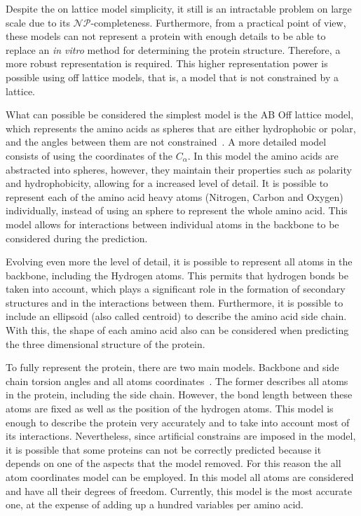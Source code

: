 Despite the on lattice model simplicity, it still is an intractable problem on large scale due to its $\mathcal{NP}$-completeness. Furthermore, from a practical point of view, these models can not represent a protein with enough details to be able to replace an \textit{in vitro} method for determining the protein structure. Therefore, a more robust representation is required. This higher representation power is possible using off lattice models, that is, a model that is not constrained by a lattice.

What can possible be considered the simplest model is the AB Off lattice model, which represents the amino acids as spheres that are either hydrophobic or polar, and the angles between them are not constrained~\cite{berger1998protein}.
A more detailed model consists of using the coordinates of the $C_\alpha$. In this model the amino acids are abstracted into spheres, however, they maintain their properties such as polarity and hydrophobicity, allowing for a increased level of detail. It is possible to represent each of the amino acid heavy atoms (Nitrogen, Carbon and Oxygen) individually, instead of using an sphere to represent the whole amino acid. This model allows for interactions between individual atoms in the  backbone to be considered during the prediction.

Evolving even more the level of detail, it is possible to represent all atoms in the backbone, including the Hydrogen atoms. This permits that hydrogen bonds be taken into account, which plays a significant
role in the formation of secondary structures and in the interactions between them. Furthermore, it is possible to include an ellipsoid (also called centroid) to describe the amino acid side chain. With this, the shape of each amino acid also can be considered when predicting the three dimensional structure of the protein.

To fully represent the protein, there are two main models. Backbone and side chain torsion angles and all atoms coordinates~\cite{rohl2004protein}.
The former describes all atoms in the protein, including the side chain. However, the bond length between these atoms are fixed as well as the position of the hydrogen atoms. This model is enough to describe the protein very accurately and to take into account most of its interactions. Nevertheless, since artificial constrains are imposed in the model, it is possible that some proteins can not be correctly predicted because it depends on one of the aspects that the model removed. For this reason the all atom coordinates model can be employed. In this model all atoms are considered and have all their degrees of freedom. Currently, this model is the most accurate one, at the expense of adding up a hundred variables per amino acid.

